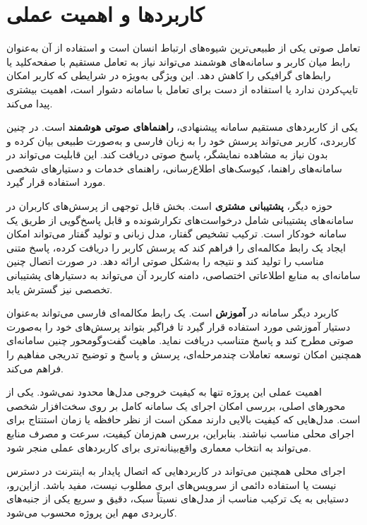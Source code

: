 \section{کاربردها و اهمیت عملی}

تعامل صوتی یکی از طبیعی‌ترین شیوه‌های ارتباط انسان است و استفاده
از آن به‌عنوان رابط میان کاربر و سامانه‌های هوشمند می‌تواند نیاز
به تعامل مستقیم با صفحه‌کلید یا رابط‌های گرافیکی را کاهش دهد.
این ویژگی به‌ویژه در شرایطی که کاربر امکان تایپ‌کردن ندارد یا
استفاده از دست برای تعامل با سامانه دشوار است، اهمیت بیشتری پیدا
می‌کند.

یکی از کاربردهای مستقیم سامانه پیشنهادی،
\textbf{راهنماهای صوتی هوشمند}
است.
در چنین کاربردی، کاربر می‌تواند پرسش خود را به زبان فارسی و
به‌صورت طبیعی بیان کرده و بدون نیاز به مشاهده نمایشگر، پاسخ
صوتی دریافت کند.
این قابلیت می‌تواند در سامانه‌های راهنما، کیوسک‌های اطلاع‌رسانی،
راهنمای خدمات و دستیارهای شخصی مورد استفاده قرار گیرد.

حوزه دیگر،
\textbf{پشتیبانی مشتری}
است.
بخش قابل توجهی از پرسش‌های کاربران در سامانه‌های پشتیبانی شامل
درخواست‌های تکرارشونده و قابل پاسخ‌گویی از طریق یک سامانه
خودکار است.
ترکیب تشخیص گفتار، مدل زبانی و تولید گفتار می‌تواند امکان ایجاد
یک رابط مکالمه‌ای را فراهم کند که پرسش کاربر را دریافت کرده،
پاسخ متنی مناسب را تولید کند و نتیجه را به‌شکل صوتی ارائه دهد.
در صورت اتصال چنین سامانه‌ای به منابع اطلاعاتی اختصاصی،
دامنه کاربرد آن می‌تواند به دستیارهای پشتیبانی تخصصی نیز گسترش یابد.

کاربرد دیگر سامانه در
\textbf{آموزش}
است.
یک رابط مکالمه‌ای فارسی می‌تواند به‌عنوان دستیار آموزشی مورد
استفاده قرار گیرد تا فراگیر بتواند پرسش‌های خود را به‌صورت صوتی
مطرح کند و پاسخ متناسب دریافت نماید.
ماهیت گفت‌وگومحور چنین سامانه‌ای همچنین امکان توسعه تعاملات
چندمرحله‌ای، پرسش و پاسخ و توضیح تدریجی مفاهیم را فراهم می‌کند.

اهمیت عملی این پروژه تنها به کیفیت خروجی مدل‌ها محدود نمی‌شود.
یکی از محورهای اصلی، بررسی امکان اجرای یک سامانه کامل
بر روی سخت‌افزار شخصی است.
مدل‌هایی که کیفیت بالایی دارند ممکن است از نظر حافظه یا زمان
استنتاج برای اجرای محلی مناسب نباشند.
بنابراین، بررسی هم‌زمان کیفیت، سرعت و مصرف منابع می‌تواند به
انتخاب معماری واقع‌بینانه‌تری برای کاربردهای عملی منجر شود.

اجرای محلی همچنین می‌تواند در کاربردهایی که اتصال پایدار به
اینترنت در دسترس نیست یا استفاده دائمی از سرویس‌های ابری مطلوب
نیست، مفید باشد.
ازاین‌رو، دستیابی به یک ترکیب مناسب از مدل‌های نسبتاً سبک،
دقیق و سریع یکی از جنبه‌های کاربردی مهم این پروژه محسوب می‌شود.


